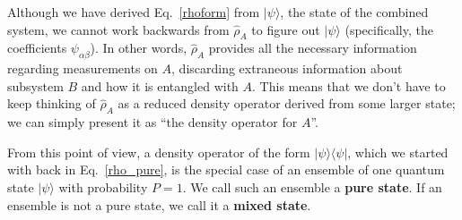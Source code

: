 \documentclass[prx,12pt]{revtex4-2}
\begin{document}
Although we have derived Eq.~\eqref{rhoform} from $|\psi\rangle$, the
state of the combined system, we cannot work backwards from
$\hat{\rho}_A$ to figure out $|\psi\rangle$ (specifically, the
coefficients $\psi_{\alpha\beta}$).  In other words, $\hat{\rho}_A$
provides all the necessary information regarding measurements on $A$,
discarding extraneous information about subsystem $B$ and how it is
entangled with $A$.  This means that we don't have to keep thinking of
$\hat{\rho}_A$ as a reduced density operator derived from some larger
state; we can simply present it as ``the density operator for $A$''.

From this point of view, a density operator of the form
$|\psi\rangle\langle\psi|$, which we started with back in
Eq.~\eqref{rho_pure}, is the special case of an ensemble of one
quantum state $|\psi\rangle$ with probability $P = 1$.  We call such
an ensemble a \textbf{pure state}.  If an ensemble is not a pure
state, we call it a \textbf{mixed state}.
\end{document}
